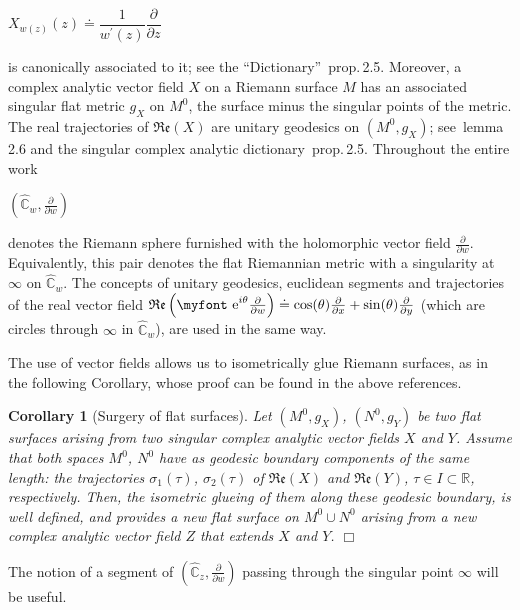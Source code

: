 \documentclass[final,3p,times]{elsarticle}
\newcommand{\CW}{\ensuremath{{\widehat{\mathbb C}}}}
\newcommand{\RR}{\ensuremath{{\mathbb R}}}
\newcommand{\e}{{\text{\myfont e}}}
\renewcommand{\Re}[1]{{\mathfrak{Re}\left(#1\right)}}
\newcommand{\del}[2]{\frac{\partial #1}{\partial #2}}
\newtheorem{corollary}[theorem]{Corollary}
\theoremstyle{definition}
\begin{document}
\centerline{$X_{w(z)}(z) \doteq 
\dfrac{1}{w^\prime(z)} \dfrac{\partial }{ \partial z}$ }

\noindent 
is canonically associated to it;
see the ``Dictionary'' \cite{AlvarezMucino3}\,prop.\,2.5.
Moreover,
a complex analytic vector field $X$ on a Riemann 
surface $M$ has an associated singular flat metric $g_X$
on $M^0$, the surface minus the singular points of the metric. 
The real trajectories of $\Re{X}$ are unitary geodesics
on $(M^0, g_X)$; see 
\cite{AlvarezMucino1}\,lemma\,2.6 
and
the singular complex analytic dictionary
\cite{AlvarezMucino3}\,prop.\,2.5.  
Throughout the entire work 

\centerline{$(\CW_w, \del{}{w})$}

\noindent  
denotes the Riemann sphere furnished with the 
holomorphic vector field $\del{}{w}$. 
Equivalently, this pair denotes the flat Riemannian metric with a 
singularity at $\infty$ on $\CW_w$. 
The concepts of unitary geodesics,
euclidean segments and trajectories of 
the real vector field 
$\Re{\e^{i \theta} \del{}{w}} \doteq 
\cos(\theta)\del{}{x}+
\sin(\theta)\del{}{y}$ 
(which are circles through $\infty$ in $\CW_w$),
are used in the same way.  




The use of vector fields allows us to isometrically glue Riemann surfaces, 
as in the following Corollary, whose proof can be found in the above references.

\begin{corollary}[Surgery of flat surfaces]
\label{cor:pegado-isometrico}  
Let $(M^0, g_X)$, $(N^0, g_Y)$ be two flat surfaces arising 
from two singular complex analytic vector fields $X$ and $Y$. 
Assume that both spaces $M^0$, $N^0$
have as geodesic boundary components of the same length: the trajectories
$\sigma_1 (\tau)$, $\sigma_2(\tau)$ of $\Re{X}$ and $\Re{Y}$, 
$\tau \in I \subset \RR$,
respectively. Then,
the isometric glueing of them 
along these geodesic boundary,  
is well defined, and provides a new flat surface 
on $M^0 \cup N^0$ arising from a new complex analytic vector field
$Z$ that extends $X$ and $Y$.
\hfill $\Box$
\end{corollary}

The notion of a segment of $(\CW_z, \del{}{w})$
passing through the singular point $\infty$ will be useful.
\end{document}
